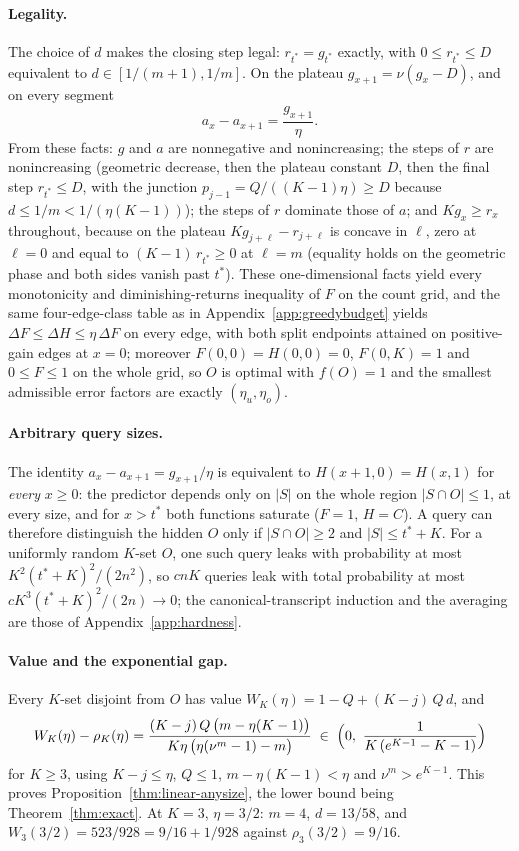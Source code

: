 \paragraph{Legality.}
The choice of $d$ makes the closing step legal:
$r_{t^{\ast}}=g_{t^{\ast}}$ exactly, with
$0\le r_{t^{\ast}}\le D$ equivalent to $d\in[1/(m+1),1/m]$.  On the
plateau $g_{x+1}=\nu(g_x-D)$, and on every segment
\[
  a_x-a_{x+1}=\frac{g_{x+1}}{\eta}.
\]
From these facts: $g$ and $a$ are nonnegative and nonincreasing; the
steps of $r$ are nonincreasing (geometric decrease, then the plateau
constant $D$, then the final step $r_{t^{\ast}}\le D$, with the junction
$p_{j-1}=Q/((K-1)\eta)\ge D$ because $d\le1/m<1/(\eta(K-1))$); the steps
of $r$ dominate those of $a$; and $Kg_x\ge r_x$ throughout, because on
the plateau $Kg_{j+\ell}-r_{j+\ell}$ is concave in $\ell$, zero at
$\ell=0$ and equal to $(K-1)\,r_{t^{\ast}}\ge0$ at $\ell=m$ (equality
holds on the geometric phase and both sides vanish past $t^{\ast}$).
These one-dimensional facts yield every monotonicity and
diminishing-returns inequality of $F$ on the count grid, and the same
four-edge-class table as in Appendix~\ref{app:greedybudget} yields
$\Delta F\le\Delta H\le\eta\,\Delta F$ on every edge, with both split
endpoints attained on positive-gain edges at $x=0$; moreover
$F(0,0)=H(0,0)=0$, $F(0,K)=1$ and $0\le F\le1$ on the whole grid, so $O$
is optimal with $f(O)=1$ and the smallest admissible error factors are
exactly $(\eta_u,\eta_o)$.

\paragraph{Arbitrary query sizes.}
The identity $a_x-a_{x+1}=g_{x+1}/\eta$ is equivalent to
$H(x+1,0)=H(x,1)$ for \emph{every} $x\ge0$: the predictor depends only on
$|S|$ on the whole region $|S\cap O|\le1$, at every size, and for
$x>t^{\ast}$ both functions saturate ($F=1$, $H=C$).  A query can
therefore distinguish the hidden $O$ only if $|S\cap O|\ge2$ and
$|S|\le t^{\ast}+K$.  For a uniformly random $K$-set $O$, one such query
leaks with probability at most $K^{2}(t^{\ast}+K)^{2}/(2n^{2})$, so $cnK$
queries leak with total probability at most
$cK^{3}(t^{\ast}+K)^{2}/(2n)\to0$; the canonical-transcript induction and
the averaging are those of Appendix~\ref{app:hardness}.

\paragraph{Value and the exponential gap.}
Every $K$-set disjoint from $O$ has value
$W_K(\eta)=1-Q+(K-j)\,Q\,d$, and
\[
  W_K(\eta)-\rho_K(\eta)
  =\frac{(K-j)\,Q\,\bigl(m-\eta(K-1)\bigr)}
        {K\eta\,\bigl(\eta(\nu^{m}-1)-m\bigr)}
  \;\in\;\Bigl(0,\ \frac{1}{K\,(e^{K-1}-K-1)}\Bigr)
\]
for $K\ge3$, using $K-j\le\eta$, $Q\le1$, $m-\eta(K-1)<\eta$ and
$\nu^{m}>e^{K-1}$.  This proves Proposition~\ref{thm:linear-anysize}, the
lower bound being Theorem~\ref{thm:exact}.  At $K=3$, $\eta=3/2$: $m=4$,
$d=13/58$, and $W_3(3/2)=523/928=9/16+1/928$ against
$\rho_3(3/2)=9/16$.

